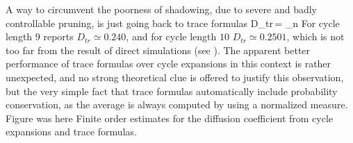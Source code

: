 {%
%
%
%
A way to circumvent the poorness of shadowing, due to severe and
badly controllable pruning, is just going back to trace formulas
\beq
D_{tr}\,=
\lim_{n \to \infty}
\label{DL-trace}
\eeq
For cycle
length $9$  reports
$D_{tr}\simeq 0.240$, and for cycle length $10$ $D_{tr}\simeq 0.2501$,
which is not too far from the result of direct simulations (see
).
The apparent better performance of trace formulas over cycle expansions in
this context is rather unexpected, and no strong theoretical clue
is offered to justify this observation, but the very simple
fact that trace formulas automatically include probability conservation,
as the average is always computed by using a normalized measure.
%
{}{
Figure was here
Finite order estimates for the diffusion coefficient from
cycle expansions and trace formulas.
}
%
}
